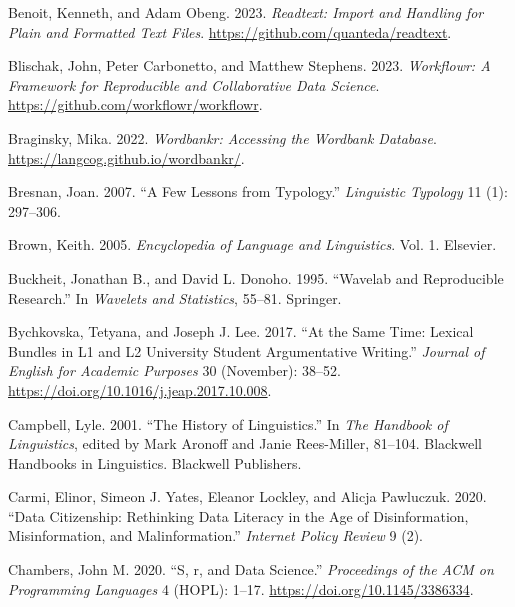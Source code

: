 \documentclass[
  letterpaper,
  DIV=11,
  numbers=noendperiod]{scrreport}
\newlength{\cslhangindent}
\newlength{\cslentryspacingunit} %
\newenvironment{CSLReferences}[2] %
 {%
  \setlength{\parindent}{0pt}
  \ifodd #1
  \let\oldpar\par
  \def\par{\hangindent=\cslhangindent\oldpar}
  \fi
  \setlength{\parskip}{#2\cslentryspacingunit}
 }%
 {}
\theoremstyle{definition}
\theoremstyle{remark}
\begin{document}
\begin{CSLReferences}{1}{0}
\leavevmode{}%
Benoit, Kenneth, and Adam Obeng. 2023. \emph{Readtext: Import and
Handling for Plain and Formatted Text Files}.
\url{https://github.com/quanteda/readtext}.

\leavevmode{}%
Blischak, John, Peter Carbonetto, and Matthew Stephens. 2023.
\emph{Workflowr: A Framework for Reproducible and Collaborative Data
Science}. \url{https://github.com/workflowr/workflowr}.

\leavevmode{}%
Braginsky, Mika. 2022. \emph{Wordbankr: Accessing the Wordbank
Database}. \url{https://langcog.github.io/wordbankr/}.

\leavevmode{}%
Bresnan, Joan. 2007. {``A Few Lessons from Typology.''} \emph{Linguistic
Typology} 11 (1): 297--306.

\leavevmode{}%
Brown, Keith. 2005. \emph{Encyclopedia of Language and Linguistics}.
Vol. 1. Elsevier.

\leavevmode{}%
Buckheit, Jonathan B., and David L. Donoho. 1995. {``Wavelab and
Reproducible Research.''} In \emph{Wavelets and Statistics}, 55--81.
Springer.

\leavevmode{}%
Bychkovska, Tetyana, and Joseph J. Lee. 2017. {``At the Same Time:
Lexical Bundles in L1 and L2 University Student Argumentative
Writing.''} \emph{Journal of English for Academic Purposes} 30
(November): 38--52. \url{https://doi.org/10.1016/j.jeap.2017.10.008}.

\leavevmode{}%
Campbell, Lyle. 2001. {``The History of Linguistics.''} In \emph{The
Handbook of Linguistics}, edited by Mark Aronoff and Janie Rees-Miller,
81--104. Blackwell Handbooks in Linguistics. Blackwell Publishers.

\leavevmode{}%
Carmi, Elinor, Simeon J. Yates, Eleanor Lockley, and Alicja Pawluczuk.
2020. {``Data Citizenship: Rethinking Data Literacy in the Age of
Disinformation, Misinformation, and Malinformation.''} \emph{Internet
Policy Review} 9 (2).

\leavevmode{}%
Chambers, John M. 2020. {``S, r, and Data Science.''} \emph{Proceedings
of the ACM on Programming Languages} 4 (HOPL): 1--17.
\url{https://doi.org/10.1145/3386334}.


\end{CSLReferences}
\end{document}
